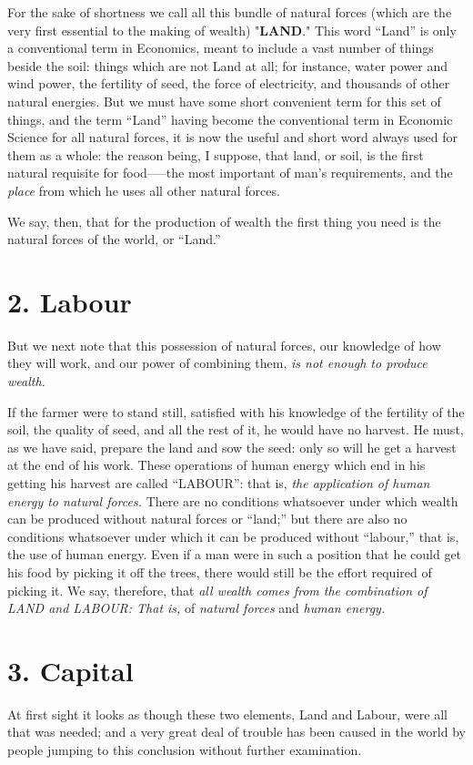 \documentclass{book}
\begin{document}
For the sake of shortness we call all this bundle of natural forces (which are the very first essential to the making of wealth) "\textbf{LAND}." This word “Land” is only a conventional term in Economics, meant to include a vast number of things beside the soil: things which are not Land at all; for instance, water power and wind power, the fertility of seed, the force of electricity, and thousands of other natural energies. But we must have some short convenient term for this set of things, and the term “Land” having become the conventional term in Economic Science for all natural forces, it is now the useful and short word always used for them as a whole: the reason being, I suppose, that land, or soil, is the first natural requisite for food—–the most important of man’s requirements, and the \emph{place} from which he uses all other natural forces.

We say, then, that for the production of wealth the first thing you need is the natural forces of the world, or “Land.”

\section{2. Labour}
But we next note that this possession of natural forces, our knowledge of how they will work, and our power of combining them, \emph{is not enough to produce wealth.}

If the farmer were to stand still, satisfied with his knowledge of the fertility of the soil, the quality of seed, and all the rest of it, he would have no harvest. He must, as we have said, prepare the land and sow the seed: only so will he get a harvest at the end of his work. These operations of human energy which end in his getting his harvest are called “LABOUR”: that is, \emph{the application of human energy to natural forces.} There are no conditions whatsoever under which wealth can be produced without natural forces or “land;” but there are also no conditions whatsoever under which it can be produced without “labour,” that is, the use of human energy. Even if a man were in such a position that he could get his food by picking it off the trees, there would still be the effort required of picking it. We say, therefore, that \emph{all wealth comes from the combination of LAND and LABOUR: That is,} of \emph{natural forces} and \emph{human energy.}

\section{3. Capital}
At first sight it looks as though these two elements, Land and Labour, were all that was needed; and a very great deal of trouble has been caused in the world by people jumping to this conclusion without further examination.
\end{document}
